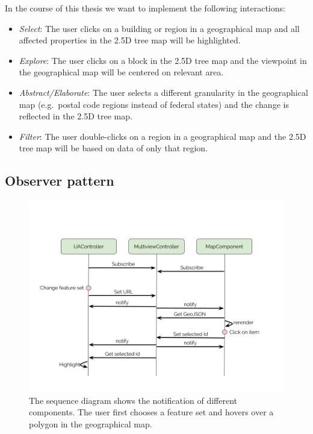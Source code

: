 \documentclass{article}
\newcommand{\tmap}{\textsc{2.5D} tree map}
\begin{document}
In the course of this thesis we want to implement the following interactions:
\begin{itemize}
  \item
    \emph{Select}: The user clicks on a building or region in a geographical map and all affected properties in the \tmap{} will be highlighted.
  \item
    \emph{Explore}: The user clicks on a block in the \tmap{} and the viewpoint in the geographical map will be centered on relevant area.
  \item
    \emph{Abstract/Elaborate}: The user selects a different granularity in the geographical map (e.g.\ postal code regions instead of federal states) and the change is reflected in the \tmap{}.
  \item
    \emph{Filter}: The user double-clicks on a region in a geographical map and the \tmap{} will be based on data of only that region.
\end{itemize}

\subsection{Observer pattern}
\begin{figure}[h!]
  \centering
  \includegraphics[width=\textwidth]{images/sequence-diagram.png}
  \caption{The sequence diagram shows the notification of different components.
  The user first chooses a feature set and hovers over a polygon in the geographical map.}
  \label{fig:implementation:sequence-diagram}
\end{figure}
\end{document}
